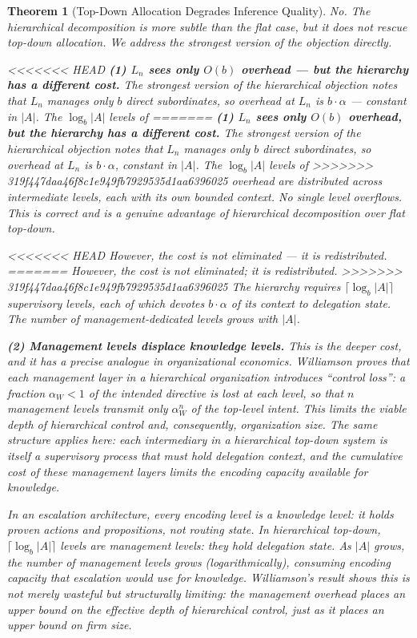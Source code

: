 \documentclass[11pt]{article}
\newtheorem{theorem}{Theorem}
\theoremstyle{definition}
\begin{document}
\begin{theorem}[Top-Down Allocation Degrades Inference Quality]
No. The hierarchical decomposition is more subtle than the flat case,
but it does not rescue top-down allocation. We address the strongest
version of the objection directly.

<<<<<<< HEAD
\textbf{(1) $L_n$ sees only $O(b)$ overhead --- but the hierarchy has
a different cost.}
The strongest version of the hierarchical objection notes that $L_n$
manages only $b$ direct subordinates, so overhead at $L_n$ is
$b \cdot \alpha$ --- constant in $|A|$. The $\log_b |A|$ levels of
=======
\textbf{(1) $L_n$ sees only $O(b)$ overhead, but the hierarchy has
a different cost.}
The strongest version of the hierarchical objection notes that $L_n$
manages only $b$ direct subordinates, so overhead at $L_n$ is
$b \cdot \alpha$, constant in $|A|$. The $\log_b |A|$ levels of
>>>>>>> 319f447daa46f8c1e949fb7929535d1aa6396025
overhead are distributed across intermediate levels, each with its own
bounded context. No single level overflows. This is correct and is a
genuine advantage of hierarchical decomposition over flat top-down.

<<<<<<< HEAD
However, the cost is not eliminated --- it is \emph{redistributed}.
=======
However, the cost is not eliminated; it is \emph{redistributed}.
>>>>>>> 319f447daa46f8c1e949fb7929535d1aa6396025
The hierarchy requires $\lceil \log_b |A| \rceil$ supervisory levels,
each of which devotes $b \cdot \alpha$ of its context to delegation
state. The number of management-dedicated levels grows with $|A|$.

\textbf{(2) Management levels displace knowledge levels.}
This is the deeper cost, and it has a precise analogue in organizational
economics. Williamson \cite{Williamson1967} proves that each management
layer in a hierarchical organization introduces ``control loss'': a
fraction $\alpha_W < 1$ of the intended directive is lost at each level,
so that $n$ management levels transmit only $\alpha_W^n$ of the
top-level intent. This limits the viable depth of hierarchical control
and, consequently, organization size. The same structure applies here:
each intermediary in a hierarchical top-down system is itself a
supervisory process that must hold delegation context, and the
cumulative cost of these management layers limits the encoding
capacity available for knowledge.

In an escalation architecture, every encoding level is a
\emph{knowledge level}: it holds proven actions and propositions, not
routing state. In hierarchical top-down, $\lceil \log_b |A| \rceil$
levels are \emph{management levels}: they hold delegation state. As
$|A|$ grows, the number of management levels grows (logarithmically),
consuming encoding capacity that escalation would use for knowledge.
Williamson's result shows this is not merely wasteful but structurally
limiting: the management overhead places an upper bound on the
effective depth of hierarchical control, just as it places an upper
bound on firm size.


\end{theorem}
\end{document}

